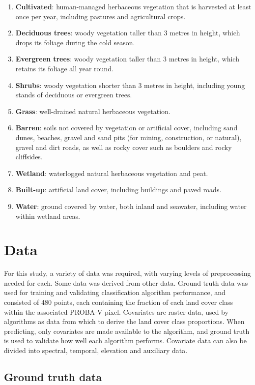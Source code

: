\documentclass[a4paper,12pt]{scrbook}
\begin{document}
\begin{enumerate}
 \item \textbf{Cultivated}: human-managed herbaceous vegetation that is harvested at least once per year, including pastures and agricultural crops.
 \item \textbf{Deciduous trees}: woody vegetation taller than 3 metres in height, which drops its foliage during the cold season.
 \item \textbf{Evergreen trees}: woody vegetation taller than 3 metres in height, which retains its foliage all year round.
 \item \textbf{Shrubs}: woody vegetation shorter than 3 metres in height, including young stands of deciduous or evergreen trees.
 \item \textbf{Grass}: well-drained natural herbaceous vegetation.
 \item \textbf{Barren}: soils not covered by vegetation or artificial cover, including sand dunes, beaches, gravel and sand pits (for mining, construction, or natural), gravel and dirt roads, as well as rocky cover such as boulders and rocky cliffsides.
 \item \textbf{Wetland}: waterlogged natural herbaceous vegetation and peat.
 \item \textbf{Built-up}: artificial land cover, including buildings and paved roads.
 \item \textbf{Water}: ground covered by water, both inland and seawater, including water within wetland areas.
\end{enumerate}

\section{Data}

For this study, a variety of data was required, with varying levels of preprocessing needed for each. Some data was derived from other data. Ground truth data was used for training and validating classification algorithm performance, and consisted of 480 points, each containing the fraction of each land cover class within the associated PROBA-V pixel. Covariates are raster data, used by algorithms as data from which to derive the land cover class proportions. When predicting, only covariates are made available to the algorithm, and ground truth is used to validate how well each algorithm performs. Covariate data can also be divided into spectral, temporal, elevation and auxiliary data.

\subsection{Ground truth data}
\end{document}
